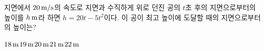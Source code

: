지면에서 $20\mkern3mu \mathrm{m/s}$의 속도로 지면과 수직하게 위로 던진 공의 $t$초 후의 지면으로부터의 높이를 $h\mkern3mu \mathrm{m}$라 하면 $h=20t-5t^2$이다. 이 공이 최고 높이에 도달할 때의 지면으로부터의 높이는?
\begin{choices32}{$18\mkern3mu \mathrm{m}$}{$19\mkern3mu \mathrm{m}$}{$20\mkern3mu \mathrm{m}$}{$21\mkern3mu \mathrm{m}$}{$22\mkern3mu \mathrm{m}$}\end{choices32}
